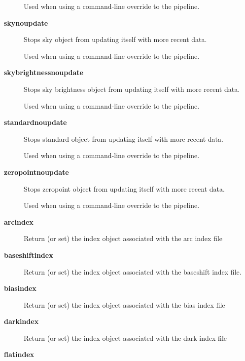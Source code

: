 \begin{description}
Used when using a command-line override to the pipeline.


\item[{\textbf{skynoupdate}}] \mbox{}

Stops sky object from updating itself with more recent data.



Used when using a command-line override to the pipeline.


\item[{\textbf{skybrightnessnoupdate}}] \mbox{}

Stops sky brightness object from updating itself with more recent
data.



Used when using a command-line override to the pipeline.


\item[{\textbf{standardnoupdate}}] \mbox{}

Stops standard object from updating itself with more recent data.



Used when using a command-line override to the pipeline.


\item[{\textbf{zeropointnoupdate}}] \mbox{}

Stops zeropoint object from updating itself with more recent data.



Used when using a command-line override to the pipeline.


\item[{\textbf{arcindex}}] \mbox{}

Return (or set) the index object associated with the arc index file


\item[{\textbf{baseshiftindex}}] \mbox{}

Return (or set) the index object associated with the baseshift index file.


\item[{\textbf{biasindex}}] \mbox{}

Return (or set) the index object associated with the bias index file


\item[{\textbf{darkindex}}] \mbox{}

Return (or set) the index object associated with the dark index file


\item[{\textbf{flatindex}}] \mbox{}


\end{description}
